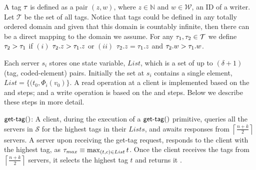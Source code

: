 A tag $\tau_{}$ is defined as a pair $(z, w)$, where $z \in \mathbb{N}$ and $w \in \mathcal{W}$, an ID of a writer.
Let $\mathcal{T}$ be the set of all tags.
Notice that tags could be defined in any totally ordered domain and given that this domain is countably infinite, then 
there can be a direct mapping to the domain we assume. 
For any  $\tau_{1}, \tau_{2} \in \mathcal{T}$ we define  $\tau_{2} > \tau_{1}$ if $(i)$ $\tau_{2}.z > \tau_{1}.z$ or $(ii)$ $\tau_{2}.z = \tau_{1}.z$ and $\tau_{2}.w > \tau_{1}.w$.

Each server $s_i$ stores one  state variable,  $List$,  which is a set of up to $(\delta + 1)$  (tag, coded-element) pairs. Initially the set at $s_i$ contains a single element, $List = \{ (t_0,  \Phi_i(v_0)\}$.  
 A read operation at a client is implemented based on the  and  steps; and a write operation is based on the  and  steps. Below we describe these steps in more detail.
 
%

$\dagettag{c}$: A  client,  during the execution of a  $\dagettag{c}$ primitive, queries all the servers in $\mathcal{S}$ for the highest tags in their  $Lists$, and awaits responses from $\left\lceil \frac{n+k}{2} \right\rceil$ servers.
A server upon receiving the {\sc get-tag} request, 
responds to the client with the highest tag, as $\tau_{max} \equiv \max_{(t,c) \in List}t$. 
Once the client receives the tags from $\left\lceil \frac{n+k}{2} \right\rceil$ servers,  it selects  the highest  tag $t$ and returns it . 

